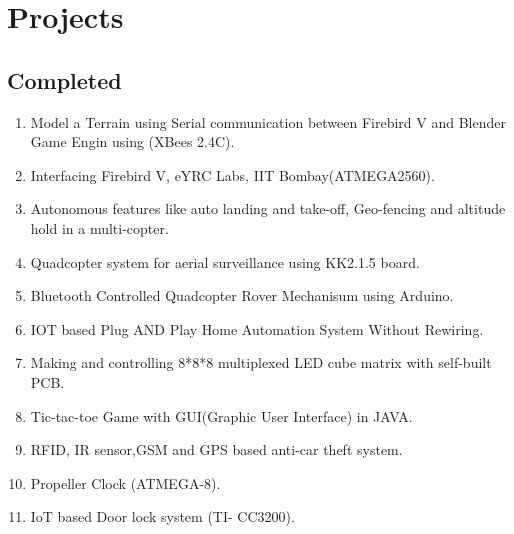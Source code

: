 \documentclass[11pt]{article}
\begin{document}
\begin{minipage}{1.0\linewidth}

\section{\color{orange}Pro\color{black}jects}
\subsection{Co\color{purple}m\color{black}pl\color{purple}e\color{black}ted}
\begin{enumerate}
\item Model a Terrain using Serial communication between Firebird V and Blender Game Engin using (XBees 2.4C).
\item Interfacing Firebird V, eYRC Labs, IIT Bombay(ATMEGA2560).
\item Autonomous features like auto landing and take-off, Geo-fencing and altitude hold in a multi-copter.
\item Quadcopter system for aerial surveillance using KK2.1.5 board.
\item Bluetooth Controlled Quadcopter Rover Mechanisum using Arduino.
\item IOT based Plug AND Play Home Automation System Without Rewiring. 
\item Making and controlling 8*8*8 multiplexed LED cube matrix with self-built PCB.
\item Tic-tac-toe Game with GUI(Graphic User Interface) in JAVA.
\item RFID, IR sensor,GSM and GPS based anti-car theft system.
\item Propeller Clock  (ATMEGA-8).
\item IoT based Door lock system (TI- CC3200).
\end{enumerate}

\end{minipage}
\end{document}
